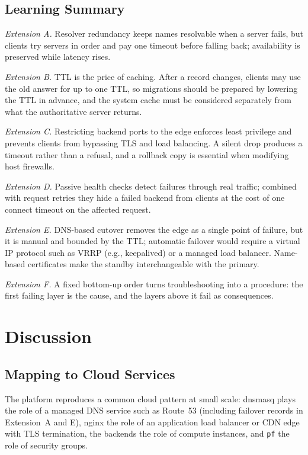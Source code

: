 \documentclass[conference,a4paper]{IEEEtran}
\newcommand{\code}[1]{\texttt{#1}}
\begin{document}
\subsection{Learning Summary}
\emph{Extension A.} Resolver redundancy keeps names resolvable when a server fails, but clients try
servers in order and pay one timeout before falling back; availability is preserved while latency
rises.

\emph{Extension B.} TTL is the price of caching. After a record changes, clients may use the old
answer for up to one TTL, so migrations should be prepared by lowering the TTL in advance, and the
system cache must be considered separately from what the authoritative server returns.

\emph{Extension C.} Restricting backend ports to the edge enforces least privilege and prevents
clients from bypassing TLS and load balancing. A silent drop produces a timeout rather than a
refusal, and a rollback copy is essential when modifying host firewalls.

\emph{Extension D.} Passive health checks detect failures through real traffic; combined with
request retries they hide a failed backend from clients at the cost of one connect timeout on the
affected request.

\emph{Extension E.} DNS-based cutover removes the edge as a single point of failure, but it is
manual and bounded by the TTL; automatic failover would require a virtual IP protocol such as VRRP
(e.g., keepalived) or a managed load balancer. Name-based certificates make the standby
interchangeable with the primary.

\emph{Extension F.} A fixed bottom-up order turns troubleshooting into a procedure: the first
failing layer is the cause, and the layers above it fail as consequences.

\section{Discussion}
\label{sec:disc}

\subsection{Mapping to Cloud Services}
The platform reproduces a common cloud pattern at small scale: dnsmasq plays the role of a
managed DNS service such as Route~53 (including failover records in Extension~A and E), nginx the
role of an application load balancer or CDN edge with TLS termination, the backends the role of
compute instances, and \code{pf} the role of security groups.
\end{document}
